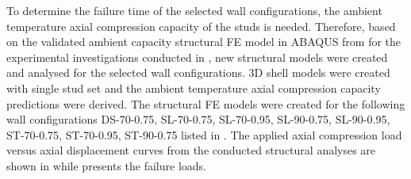 To determine the failure time of the selected wall configurations, the ambient temperature axial compression capacity of the studs is needed. Therefore, based on the validated ambient capacity structural FE model in ABAQUS from  for the experimental investigations conducted in , new structural models were created and analysed for the selected wall configurations. 3D shell models were created with single stud set and the ambient temperature axial compression capacity predictions were derived. The structural FE models were created for the following wall configurations DS-70-0.75, SL-70-0.75, SL-70-0.95, SL-90-0.75, SL-90-0.95, ST-70-0.75, ST-70-0.95, ST-90-0.75 listed in . The applied axial compression load versus axial displacement curves from the conducted structural analyses are shown in  while  presents the failure loads.

